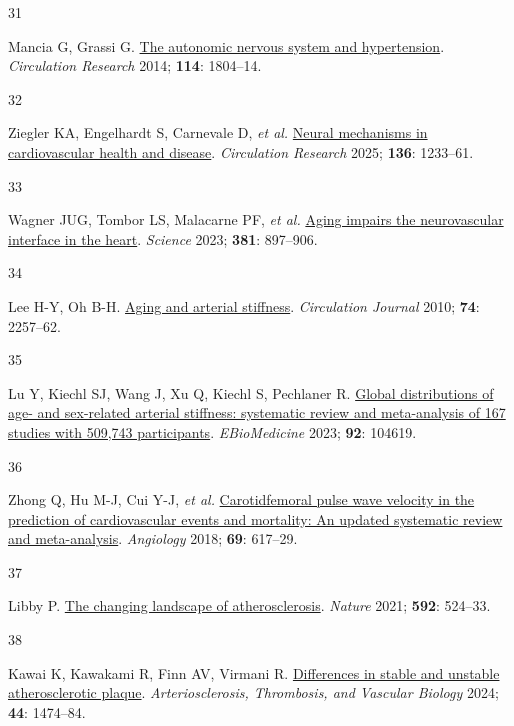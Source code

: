 \documentclass[
  letterpaper,
  headsepline=true,
  open=any]{scrbook}
\newlength{\cslhangindent}
\newlength{\csllabelwidth}
\newlength{\cslentryspacingunit} %
\newenvironment{CSLReferences}[2] %
 {%
  \setlength{\parindent}{0pt}
  \ifodd #1
  \let\oldpar\par
  \def\par{\hangindent=\cslhangindent\oldpar}
  \fi
  \setlength{\parskip}{#2\cslentryspacingunit}
 }%
 {}
\newcommand{\CSLLeftMargin}[1]{\parbox[t]{\csllabelwidth}{#1}}
\newcommand{\CSLRightInline}[1]{\parbox[t]{\linewidth - \csllabelwidth}{#1}\break}
\begin{document}
\begin{CSLReferences}{0}{0}
\leavevmode{}%
\CSLLeftMargin{31 }%
\CSLRightInline{Mancia G, Grassi G.
\href{https://doi.org/10.1161/CIRCRESAHA.114.302524}{The autonomic
nervous system and hypertension}. \emph{Circulation Research} 2014;
\textbf{114}: 1804--14.}

\leavevmode{}%
\CSLLeftMargin{32 }%
\CSLRightInline{Ziegler KA, Engelhardt S, Carnevale D, \emph{et al.}
\href{https://doi.org/10.1161/CIRCRESAHA.125.325580}{Neural mechanisms
in cardiovascular health and disease}. \emph{Circulation Research} 2025;
\textbf{136}: 1233--61.}

\leavevmode{}%
\CSLLeftMargin{33 }%
\CSLRightInline{Wagner JUG, Tombor LS, Malacarne PF, \emph{et al.}
\href{https://doi.org/10.1126/science.ade4961}{Aging impairs the
neurovascular interface in the heart}. \emph{Science} 2023;
\textbf{381}: 897--906.}

\leavevmode{}%
\CSLLeftMargin{34 }%
\CSLRightInline{Lee H-Y, Oh B-H.
\href{https://doi.org/10.1253/circj.CJ-10-0910}{Aging and arterial
stiffness}. \emph{Circulation Journal} 2010; \textbf{74}: 2257--62.}

\leavevmode{}%
\CSLLeftMargin{35 }%
\CSLRightInline{Lu Y, Kiechl SJ, Wang J, Xu Q, Kiechl S, Pechlaner R.
\href{https://doi.org/10.1016/j.ebiom.2023.104619}{Global distributions
of age- and sex-related arterial stiffness: systematic review and
meta-analysis of 167 studies with 509,743 participants}.
\emph{EBioMedicine} 2023; \textbf{92}: 104619.}

\leavevmode{}%
\CSLLeftMargin{36 }%
\CSLRightInline{Zhong Q, Hu M-J, Cui Y-J, \emph{et al.}
\href{https://doi.org/10.1177/0003319717742544}{Carotid{\textendash}femoral
pulse wave velocity in the prediction of cardiovascular events and
mortality: An updated systematic review and meta-analysis}.
\emph{Angiology} 2018; \textbf{69}: 617--29.}

\leavevmode{}%
\CSLLeftMargin{37 }%
\CSLRightInline{Libby P.
\href{https://doi.org/10.1038/s41586-021-03392-8}{The changing landscape
of atherosclerosis}. \emph{Nature} 2021; \textbf{592}: 524--33.}

\leavevmode{}%
\CSLLeftMargin{38 }%
\CSLRightInline{Kawai K, Kawakami R, Finn AV, Virmani R.
\href{https://doi.org/10.1161/ATVBAHA.124.319396}{Differences in stable
and unstable atherosclerotic plaque}. \emph{Arteriosclerosis,
Thrombosis, and Vascular Biology} 2024; \textbf{44}: 1474--84.}


\end{CSLReferences}
\end{document}
